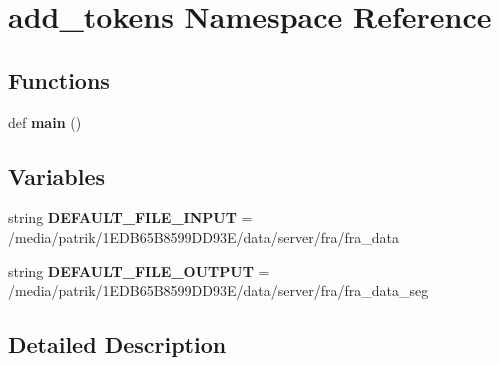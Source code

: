 \hypertarget{namespaceadd__tokens}{}\section{add\+\_\+tokens Namespace Reference}
\label{namespaceadd__tokens}
\subsection*{Functions}
\begin{DoxyCompactItemize}
\item 
def {\bfseries main} ()\hypertarget{namespaceadd__tokens_a6a526547e8c4b95a793434e2614c0b87}{}\label{namespaceadd__tokens_a6a526547e8c4b95a793434e2614c0b87}

\end{DoxyCompactItemize}
\subsection*{Variables}
\begin{DoxyCompactItemize}
\item 
string {\bfseries D\+E\+F\+A\+U\+L\+T\+\_\+\+F\+I\+L\+E\+\_\+\+I\+N\+P\+UT} = \textquotesingle{}/media/patrik/1\+E\+D\+B65\+B8599\+D\+D93\+E/data/server/fra/fra\+\_\+data\textquotesingle{}\hypertarget{namespaceadd__tokens_a6d886a3a2f1972628f32e22eb90fc34e}{}\label{namespaceadd__tokens_a6d886a3a2f1972628f32e22eb90fc34e}

\item 
string {\bfseries D\+E\+F\+A\+U\+L\+T\+\_\+\+F\+I\+L\+E\+\_\+\+O\+U\+T\+P\+UT} = \textquotesingle{}/media/patrik/1\+E\+D\+B65\+B8599\+D\+D93\+E/data/server/fra/fra\+\_\+data\+\_\+seg\textquotesingle{}\hypertarget{namespaceadd__tokens_a63631818a1c8282657299a5992b01430}{}\label{namespaceadd__tokens_a63631818a1c8282657299a5992b01430}

\end{DoxyCompactItemize}


\subsection{Detailed Description}
\begin{DoxyVerb}\end{DoxyVerb}
 